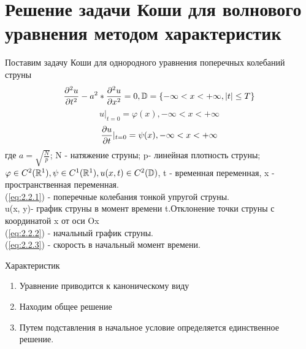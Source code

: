 \documentclass[../main.tex]{subfiles}
\begin{document}
\section{Решение задачи Коши для волнового уравнения методом характеристик}
Поставим задачу Коши для однородного уравнения поперечных колебаний струны
\begin{equation} \label{eq:2.2.1}
        \frac{\partial^2u}{\partial t^2}-a^2*\frac{\partial^2u}{\partial x^2}=0, \mathbb{D}=\lbrace- \infty<x<+\infty, |t|\leq T \rbrace
    \end{equation}
    \begin{equation} \label{eq:2.2.2}
         u|_{t=0} = \varphi(x), -\infty<x<+\infty
    \end{equation}
    \begin{equation} \label{eq:2.2.3}
        \frac{\partial u}{\partial t}|_{t=0} = \psi(x),  -\infty<x<+\infty
\end{equation}
 где $a=\sqrt{\frac{N}{p}}$; N - натяжение струны; p- линейная плотность струны;
$\varphi \in C^2(\mathbb{R}^1), \psi \in C^1(\mathbb{R}^1), u(x,t) \in C^2(\mathbb{D})$, t - временная переменная, x - пространственная переменная.\\
(\ref{eq:2.2.1}) - поперечные колебания тонкой упругой струны.\\
u(x, y)- график струны в момент времени t.Отклонение точки струны с координатой x от оси Ox\\
(\ref{eq:2.2.2}) - начальный график струны.\\
(\ref{eq:2.2.3}) - скорость в начальный момент времени.\\
\begin{center}
    { Характеристик}\\
    \begin{enumerate}
        \item 
        Уравнение приводится к каноническому виду
        \item
        Находим общее решение
        \item
        Путем подставления в начальное условие определяется единственное решение.
    \end{enumerate}
\end{center}
\end{document}
